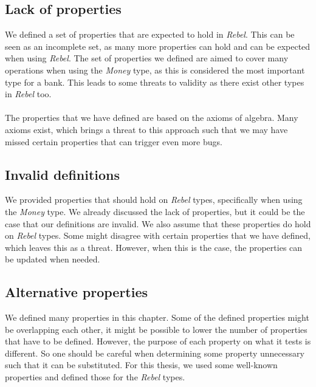 \subsection*{Lack of properties}
We defined a set of properties that are expected to hold in \textit{Rebel}.
This can be seen as an incomplete set, as many more properties can hold and can
be expected when using \textit{Rebel}. The set of properties we defined are
aimed to cover many operations when using the \textit{Money} type, as this is
considered the most important type for a bank. This leads to some threats to
validity as there exist other types in \textit{Rebel} too.\\
\\
The properties that we have defined are based on the axioms of algebra. Many
axioms exist, which brings a threat to this approach such that we may have
missed certain properties that can trigger even more bugs.

\subsection*{Invalid definitions}
We provided properties that should hold on \textit{Rebel} types, specifically
when using the \textit{Money} type. We already discussed the lack of properties,
but it could be the case that our definitions are invalid. We also assume that
these properties do hold on \textit{Rebel} types. Some might disagree with
certain properties that we have defined, which leaves this as a threat. However,
when this is the case, the properties can be updated when needed.

\subsection*{Alternative properties}
We defined many properties in this chapter. Some of the defined properties
might be overlapping each other, it might be possible to lower the number of
properties that have to be defined. However, the purpose of each property on
what it tests is different. So one should be careful when determining some
property unnecessary such that it can be substituted. For this thesis, we used
some well-known properties and defined those for the \textit{Rebel} types.
